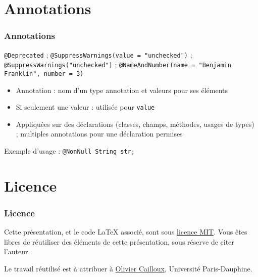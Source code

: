 \documentclass[english, french]{beamer}
\begin{document}
\section{Annotations}
\begin{frame}
	\frametitle{Annotations}
	\texttt{@Deprecated} ; \texttt{@SuppressWarnings(value = "unchecked")} ; \texttt{@SuppressWarnings("unchecked")} ; \texttt{@NameAndNumber(name = "Benjamin Franklin", number = 3)}
	\begin{itemize}
		\item Annotation : nom d’un type annotation et valeurs pour ses éléments
		\item Si seulement une valeur : utilisée pour \texttt{value}
		\item Appliquées sur des déclarations (classes, champs, méthodes, usages de types) ; multiples annotations pour une déclaration permises
	\end{itemize}
	Exemple d’usage : \texttt{@NonNull String str;}
\end{frame}

\appendix
\section{Licence}
\begin{frame}
	\frametitle{Licence}
	Cette présentation, et le code LaTeX associé, sont sous \href{http://opensource.org/licenses/MIT}{licence MIT}. Vous êtes libres de réutiliser des éléments de cette présentation, sous réserve de citer l’auteur.
	
	Le travail réutilisé est à attribuer à \href{http://www.lamsade.dauphine.fr/~ocailloux/}{Olivier Cailloux}, Université Paris-Dauphine.
\end{frame}
\end{document}
